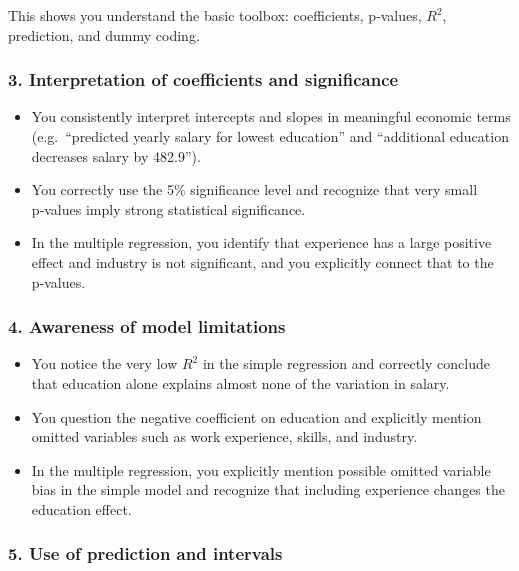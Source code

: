 \documentclass[
  letterpaper,
  DIV=11,
  numbers=noendperiod]{scrartcl}
\newcounter{none} %
\providecommand{\tightlist}{%
  \setlength{\itemsep}{0pt}\setlength{\parskip}{0pt}}
\begin{document}
This shows you understand the basic toolbox: coefficients, p‑values,
\(R^2\), prediction, and dummy coding.

\subsubsection{3. Interpretation of coefficients and
significance}\label{interpretation-of-coefficients-and-significance}

\begin{itemize}
\tightlist
\item
  You consistently interpret intercepts and slopes in meaningful
  economic terms (e.g.~``predicted yearly salary for lowest education''
  and ``additional education decreases salary by 482.9'').\\
\item
  You correctly use the 5\% significance level and recognize that very
  small p‑values imply strong statistical significance.\\
\item
  In the multiple regression, you identify that experience has a large
  positive effect and industry is not significant, and you explicitly
  connect that to the p‑values.
\end{itemize}

\subsubsection{4. Awareness of model
limitations}\label{awareness-of-model-limitations}

\begin{itemize}
\tightlist
\item
  You notice the very low \(R^2\) in the simple regression and correctly
  conclude that education alone explains almost none of the variation in
  salary.\\
\item
  You question the negative coefficient on education and explicitly
  mention omitted variables such as work experience, skills, and
  industry.\\
\item
  In the multiple regression, you explicitly mention possible omitted
  variable bias in the simple model and recognize that including
  experience changes the education effect.
\end{itemize}

\subsubsection{5. Use of prediction and
intervals}\label{use-of-prediction-and-intervals}
\end{document}
